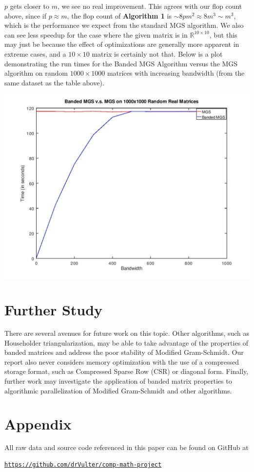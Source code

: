 \documentclass{article}
\numberwithin{pic}{section}
\numberwithin{lem}{section}
\numberwithin{thm}{section}
\numberwithin{cor}{section}
\theoremstyle{definition}
\numberwithin{ex}{section}
\numberwithin{defn}{section}
\theoremstyle{definition}
\theoremstyle{remark}
\newcommand{\R}{\ensuremath{\mathbb{R}}} %
\newlength\tindent
\renewcommand{\indent}{\hspace*{\tindent}}
\begin{document}
$p$ gets closer to $m$, we see no real improvement. This agrees with our flop
count above, since if $p\approx m$, the flop count of \textbf{Algorithm 1} is
$\sim 8pm^2\approx 8m^3\sim m^3$, which is the performance we expect from the standard
MGS algorithm. We also can see less speedup for the case where the given matrix
is in $\R^{10\times 10}$, but this may just be because the effect of optimizations are
generally more apparent in extreme cases, and a $10\times 10$ matrix is
certainly not that.
\indent Below is a plot demonstrating the run times for the Banded
MGS Algorithm versus the MGS algorithm on random $1000\times 1000$ matrices with
increasing bandwidth (from the same dataset as the table above).
\begin{center}
  \includegraphics[scale=0.4]{pi-data.jpg}
\end{center}
\section{Further Study}
\indent There are several avenues for future work on this topic. Other
algorithms, such as Householder triangularization, may be able to take advantage
of the properties of banded matrices and address the poor stability of Modified
Gram-Schmidt. Our report also never considers memory optimization with the use
of a compressed storage format, such as Compressed Sparse Row (CSR) or diagonal
form. Finally, further work may investigate the application of banded matrix
properties to algorithmic parallelization of Modified Gram-Schmidt and other
algorithms.
\appendix
{}
\section*{Appendix}
All raw data and source code referenced in this paper can be found on
GitHub at
\begin{center}
  \href{https://github.com/drVulter/comp-math-project}{\texttt{https://github.com/drVulter/comp-math-project}}
\end{center}
	

\end{document}
